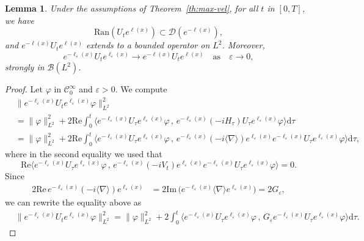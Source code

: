 \documentclass[12pt]{article}
\newcommand{\Teps}{{G_\varepsilon}}
\theoremstyle{plain}
\newtheorem{lemma}[theo]{Lemma}
\begin{document}
	\begin{lemma}\label{lm:bound_domain}Under the assumptions of Theorem~\ref{th:max-vel}, for all $t$ in $[0,T]$, we have
    \begin{equation*}
        \mathrm{Ran}(U_te^{\ell(x)})\subset\mathcal{D}(e^{-\ell(x)}),
    \end{equation*}
    and $e^{-\ell(x)}U_te^{\ell(x)}$ extends to a bounded operator on $L^2$. Moreover,
    \begin{equation*}
        e^{-\ell_\varepsilon(x)}U_te^{\ell_\varepsilon(x)} \to e^{-\ell(x)}U_te^{\ell(x)} \quad \text{as}\quad \varepsilon\to0,
    \end{equation*}
    strongly in $\mathcal{B}(L^2)$. 
\end{lemma}
	
	\begin{proof}
	    Let $\varphi$ in $\mathcal{C}^\infty_0$ and  $\varepsilon>0$.  We  compute
	    \begin{align*}
    &\big\|e^{-\ell_\varepsilon(x)}U_te^{\ell_\varepsilon(x)}\varphi\big\|_{L^2}^2\\
    &=\|\varphi\|_{L^2}^2+2\mathrm{Re}\int_0^t\big\langle e^{-\ell_\varepsilon(x)}U_\tau e^{\ell_\varepsilon(x)}\varphi \, , \, e^{-\ell_\varepsilon(x)} (-iH_\tau)U_\tau e^{\ell_\varepsilon(x)}\varphi\big\rangle\mathrm{d}\tau\\
    &=\|\varphi\|_{L^2}^2+2\mathrm{Re}\int_0^t\big\langle e^{-\ell_\varepsilon(x)}U_\tau e^{\ell_\varepsilon(x)}\varphi \, , \, e^{-\ell_\varepsilon(x)} (-i\langle\nabla\rangle)e^{\ell_\varepsilon(x)}e^{-\ell_\varepsilon(x)}U_\tau e^{\ell_\varepsilon(x)}\varphi\big\rangle\mathrm{d}\tau,
\end{align*}
where in the second equality we used that
\begin{equation*}
    \mathrm{Re}\big\langle e^{-\ell_\varepsilon(x)}U_\tau e^{\ell_\varepsilon(x)}\varphi \, , \, e^{-\ell_\varepsilon(x)} (-iV_t)e^{\ell_\varepsilon(x)}e^{-\ell_\varepsilon(x)}U_\tau e^{\ell_\varepsilon(x)}\varphi\big\rangle=0.
\end{equation*}
Since
\begin{align*}
    2\mathrm{Re}\, e^{-\ell_\varepsilon(x)} (-i\langle\nabla\rangle)e^{\ell_\varepsilon(x)}&=2\mathrm{Im}\,\big( e^{-\ell_\varepsilon(x)}\langle\nabla\rangle e^{\ell_\varepsilon(x)}\big)=2\Teps, 
\end{align*}
we can rewrite the equality above as
	\begin{align}\label{eq:Gronwall}
    &\big\|e^{-\ell_\varepsilon(x)}U_te^{\ell_\varepsilon(x)}\varphi\big\|_{L^2}^2=\|\varphi\|_{L^2}^2+2\int_0^t\big\langle e^{-\ell_\varepsilon(x)}U_\tau e^{\ell_\varepsilon(x)}\varphi \, , \, \Teps e^{-\ell_\varepsilon(x)}U_\tau e^{\ell_\varepsilon(x)}\varphi\big\rangle\mathrm{d}\tau.

\end{align}
\end{proof}
\end{document}
